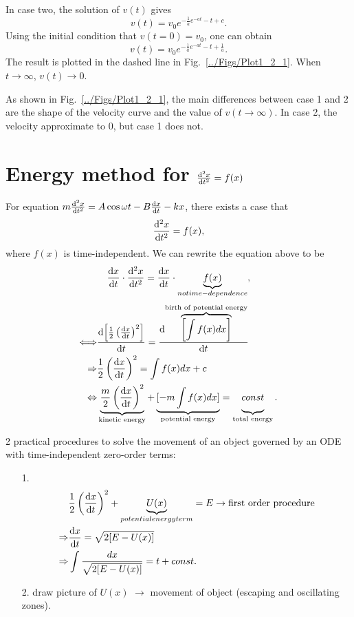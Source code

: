 In case two, the solution of $v(t)$ gives
\begin{equation}
v(t)=v_0e^{-\frac{1}{a}e^{-at}-t+c}.
\end{equation}
Using the initial condition that $v(t=0)=v_0$, one can obtain
\begin{equation}
v(t)=v_0e^{-\frac{1}{a}e^{-at}-t+\frac{1}{a}}.
\end{equation}
The result is plotted in the dashed line in Fig.~\ref{../Figs/Plot1_2_1}. When $t\rightarrow \infty$, $v(t)\rightarrow 0$.

As shown in Fig.~\ref{../Figs/Plot1_2_1}, the main differences between case 1 and 2 are the shape of the velocity curve and the value of $v(t\rightarrow \infty)$. In case 2, the velocity approximate to $0$, but case 1 does not.

\section{Energy method for $ \frac{{\mathrm d}^2 {x}}{{\mathrm d}t^2}=f(x) $}\label{sec:energymethod}
For equation $m\frac{{\mathrm d}^2 {x}}{{\mathrm d}t^2}=A\cos\omega t -B\frac{{\mathrm d} {x}}{{\mathrm d}t}-kx$, there exists a case that
\begin{equation}
\frac{{\mathrm d}^2 {x}}{{\mathrm d}t^2}=f(x),
\end{equation}
where $f(x)$ is time-independent. We can rewrite the equation above to be
\begin{equation}
\frac{{\mathrm d} {x}}{{\mathrm d}t}\cdot \frac{{\mathrm d}^2 {x}}{{\mathrm d}t^2}=\frac{{\mathrm d} {x}}{{\mathrm d}t}\cdot \underbrace{f(x)}_{no time-dependence},
\end{equation}
\begin{align}
\Longleftrightarrow & \frac{{\mathrm d} {\left[ \frac{1}{2}\left( \frac{{\mathrm d} {x}}{{\mathrm d}t}\right)^2\right]}}{{\mathrm d}t}= \frac{{\mathrm d} { \overbrace{\left[ \int{f(x)dx}\right]}^{\text{birth of potential energy}}}}{{\mathrm d}t}\\
\Rightarrow & \frac{1}{2}\left( \frac{{\mathrm d} {x}}{{\mathrm d}t}\right)^2 = \int{f(x)dx} +c \\
\Leftrightarrow & \underbrace{\frac{m}{2}\left( \frac{{\mathrm d} {x}}{{\mathrm d}t}\right)^2}_{\text{kinetic energy}} +\underbrace{[-m\int{f(x)dx}]}_{\text{potential energy}}=\underbrace{const\vphantom{\int}}_{\text{total energy}}.
\end{align}

2 practical procedures to solve the movement of an object governed by an ODE with time-independent zero-order terms:
\begin{itemize}
\item[1.] \begin{align}
            &\frac{1}{2}\left( \frac{{\mathrm d} {x}}{{\mathrm d}t}\right)^2 + \underbrace{U(x)}_{potential energy term}=E \rightarrow \text{first order procedure}\\
            \Rightarrow & \frac{{\mathrm d} {x}}{{\mathrm d}t}=\sqrt{2[E-U(x)]}\\
            \Rightarrow & \int{\frac{dx}{\sqrt{2[E-U(x)]}}}=t+const.
         \end{align}
\item[2.] draw picture of $U(x)$ $\rightarrow$ movement of object (escaping and oscillating zones).
\end{itemize}

